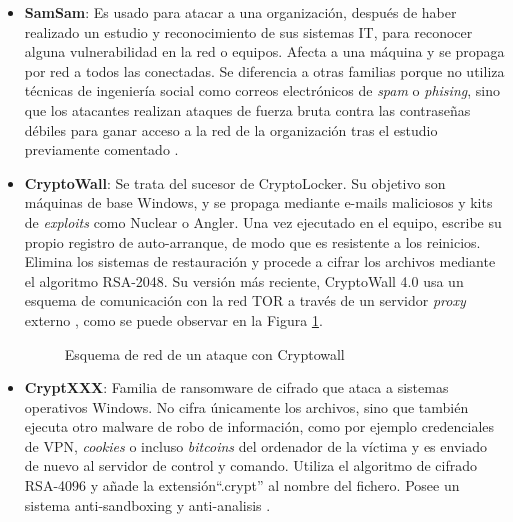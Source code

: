 \begin{itemize}
    \item \textbf{SamSam}: Es usado para atacar a una organización, después de haber realizado un estudio y reconocimiento de sus sistemas IT, para reconocer alguna vulnerabilidad en la red o equipos. Afecta a una máquina y se propaga por red a todos las conectadas. Se diferencia a otras familias porque no utiliza técnicas de ingeniería social como correos electrónicos de \textit{spam} o \textit{phising}, sino que los atacantes realizan ataques de fuerza bruta contra las contraseñas débiles para ganar acceso a la red de la organización tras el estudio previamente comentado \cite{ransommasive}. 
    
    \item \textbf{CryptoWall}: Se trata del sucesor de CryptoLocker. Su objetivo son máquinas de base Windows, y se propaga mediante e-mails maliciosos y kits de \textit{exploits} como Nuclear o Angler. Una vez ejecutado en el equipo, escribe su propio registro de auto-arranque, de modo que es resistente a los reinicios. Elimina los sistemas de restauración y procede a cifrar los archivos mediante el algoritmo \gls{RSA}-2048. Su versión más reciente, CryptoWall 4.0 usa un esquema de comunicación con la red \gls{TOR} a través de un servidor \textit{proxy} externo \cite{ransommasive}, como se puede observar en la Figura \ref{fig:imcryp}.
    \begin{figure}[htb]
    \begin{center}
    {}
    \end{center}
    \caption{Esquema de red de un ataque con Cryptowall}
    \label{fig:imcryp}
    \end{figure}
    
    \item \textbf{CryptXXX}: Familia de ransomware de cifrado que ataca a sistemas operativos Windows. No cifra únicamente los archivos, sino que también ejecuta otro malware de robo de información, como por ejemplo credenciales de VPN, \textit{cookies} o incluso \textit{bitcoins} del ordenador de la víctima y es enviado de nuevo al servidor de control y comando. Utiliza el algoritmo de cifrado \gls{RSA}-4096 y añade la extensión``.crypt'' al nombre del fichero. Posee un sistema anti-sandboxing y anti-analisis \cite{ransommasive}.
    

\end{itemize}
